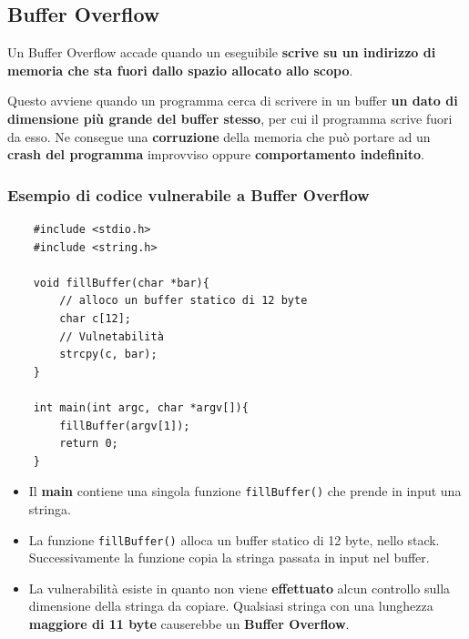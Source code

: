 \documentclass{article}
\begin{document}
\newpage

\subsection{Buffer Overflow}
Un Buffer Overflow accade quando un eseguibile \textbf{scrive su un indirizzo di memoria che sta fuori dallo spazio allocato allo scopo}. 

Questo avviene quando un programma cerca di scrivere in un buffer \textbf{un dato di dimensione più grande del buffer stesso}, per cui il programma scrive fuori da esso. Ne consegue una \textbf{corruzione} della memoria che può portare ad un \textbf{crash del programma} improvviso oppure \textbf{comportamento indefinito}.

\subsubsection{Esempio di codice vulnerabile a Buffer Overflow}

\begin{minipage}{0.50\textwidth}
\begin{verbatim}
	#include <stdio.h>
	#include <string.h>
	
	void fillBuffer(char *bar){
		// alloco un buffer statico di 12 byte
		char c[12];
		// Vulnetabilità
		strcpy(c, bar);
	}
	
	int main(int argc, char *argv[]){
		fillBuffer(argv[1]);
		return 0;
	}
\end{verbatim}
\end{minipage}
\begin{minipage}{0.46\textwidth}
\begin{itemize}
	\item Il \textbf{main} contiene una singola funzione
	\verb|fillBuffer()| che prende in input una stringa.\\
	
	\item La funzione \verb|fillBuffer()| alloca un buffer statico di 12 byte, nello stack. Successivamente la funzione copia la stringa passata in input nel buffer.\\
	
	\item La vulnerabilità esiste in quanto non viene \textbf{effettuato} alcun controllo sulla dimensione della stringa da copiare. Qualsiasi stringa con una lunghezza \textbf{maggiore di 11 byte} causerebbe un \textbf{Buffer Overflow}.
\end{itemize}
\end{minipage}
\end{document}
